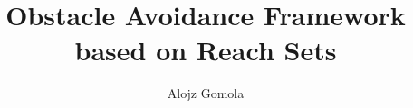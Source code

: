 \documentclass[a4paper,narrowmargins,12pt,twoside,openright,onehalfspaced,singlespacednotes]{fcup-thesis}
\author{Alojz Gomola}
\title{Obstacle Avoidance Framework based on Reach Sets}
\theoremstyle{plain}
\theoremstyle{plain}
\theoremstyle{remark}
\begin{document}
\begin{preliminary}

\maketitle

\cleardoublepage


\begin{dedication}

\end{dedication}

\begin{acknowledgements}

\end{acknowledgements}



\begin{abstract}

\end{abstract}

\begin{abstract-pt}

\end{abstract-pt}





\tableofcontents

\listoftables

\listoffigures

\listofalgorithms

\newpage
\cleardoublepage

\end{preliminary}
\end{document}
